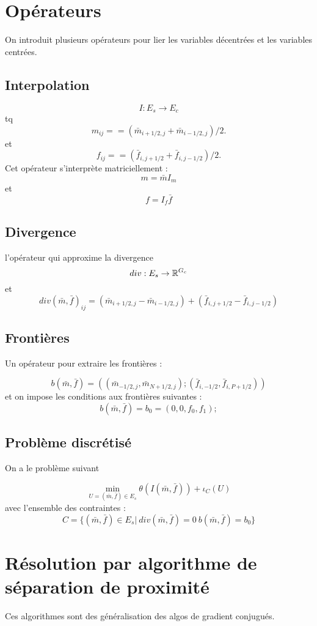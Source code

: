 \documentclass[a4paper,12pt]{article}
\begin{document}
\section{Opérateurs}
On introduit plusieurs opérateurs pour lier les variables décentrées et les variables centrées.
\subsection{Interpolation}
$$
I:E_s \rightarrow E_c
$$
tq 
$$
m_{ij} = = (\bar{m}_{i+1/2,j}+\bar{m}_{i-1/2,j})/2.
$$
et
$$
f_{ij} = = (\bar{f}_{i,j+1/2}+\bar{f}_{i,j-1/2})/2.
$$
Cet opérateur s'interprète matriciellement : 
$$
m = \bar{m}I_m
$$
et 
$$
f = I_f\bar{f}
$$

\subsection{Divergence}
l'opérateur qui approxime la divergence
$$
div : E_s\rightarrow \mathbb{R}^{G_c}
$$
et 
$$
div(\bar{m},\bar{f})_{ij} = (\bar{m}_{i+1/2,j}-\bar{m}_{i-1/2,j}) + (\bar{f}_{i,j+1/2}-\bar{f}_{i,j-1/2})
$$

\subsection{Frontières}
Un opérateur pour extraire les frontières : 

$$
b(\bar{m},\bar{f}) = ((\bar{m}_{-1/2,j},\bar{m}_{N+1/2,j});(\bar{f}_{i,-1/2},\bar{f}_{i,P+1/2}))
$$
et on impose les conditions aux frontières suivantes : 
$$
b(\bar{m},\bar{f}) = b_0=(0,0,f_0,f_1);
$$

\subsection{Problème discrétisé}

On a le problème suivant 

$$
\min_{U=(\bar{m},\bar{f})\in E_s} \theta(I(\bar{m},\bar{f})) + \iota_C(U)
$$
avec l'ensemble des contraintes :
$$
C=\{(\bar{m},\bar{f})\in E_s|\ div(\bar{m},\bar{f}) = 0\ b(\bar{m},\bar{f}) = b_0 \}
$$

\section{Résolution par algorithme de séparation de proximité}
Ces algorithmes sont des généralisation des algos de gradient conjugués. \\
\end{document}
